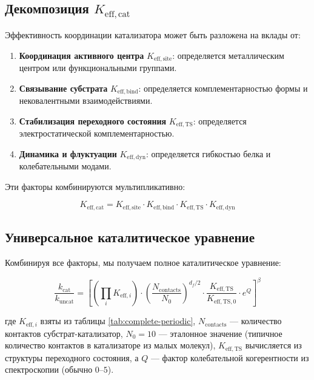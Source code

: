 \documentclass[12pt,a4paper]{article}
\theoremstyle{remark}
\newcommand{\df}{d_{\!f}}
\begin{document}
	\subsection{Декомпозиция \(K_{\mathrm{eff},\text{cat}}\)}
	
	Эффективность координации катализатора может быть разложена на вклады от:
	\begin{enumerate}
		\item \textbf{Координация активного центра} \(K_{\mathrm{eff},\text{site}}\): определяется металлическим центром или функциональными группами.
		\item \textbf{Связывание субстрата} \(K_{\mathrm{eff},\text{bind}}\): определяется комплементарностью формы и нековалентными взаимодействиями.
		\item \textbf{Стабилизация переходного состояния} \(K_{\mathrm{eff},\text{TS}}\): определяется электростатической комплементарностью.
		\item \textbf{Динамика и флуктуации} \(K_{\mathrm{eff},\text{dyn}}\): определяется гибкостью белка и колебательными модами.
	\end{enumerate}
	
	Эти факторы комбинируются мультипликативно:
	
	\begin{equation}
		K_{\mathrm{eff},\text{cat}} = K_{\mathrm{eff},\text{site}} \cdot K_{\mathrm{eff},\text{bind}} \cdot K_{\mathrm{eff},\text{TS}} \cdot K_{\mathrm{eff},\text{dyn}}
		\label{eq:keff-cat}
	\end{equation}
	
	\subsection{Универсальное каталитическое уравнение}
	
	Комбинируя все факторы, мы получаем полное каталитическое уравнение:
	
	\begin{equation}
		\boxed{\frac{k_{\text{cat}}}{k_{\text{uncat}}} = \left[ \left(\prod_i K_{\mathrm{eff},i}\right) \cdot \left(\frac{N_{\text{contacts}}}{N_0}\right)^{\df/2} \cdot \frac{K_{\mathrm{eff},\text{TS}}}{K_{\mathrm{eff},\text{TS},0}} \cdot e^{Q} \right]^{\beta}}
		\label{eq:cat-universal}
	\end{equation}
	
	где $K_{\mathrm{eff},i}$ взяты из таблицы \ref{tab:complete-periodic}, $N_{\text{contacts}}$ — количество контактов субстрат-катализатор, $N_0 = 10$ — эталонное значение (типичное количество контактов в катализаторе из малых молекул), $K_{\mathrm{eff},\text{TS}}$ вычисляется из структуры переходного состояния, а $Q$ — фактор колебательной когерентности из спектроскопии (обычно $0$--$5$).
	
\end{document}
